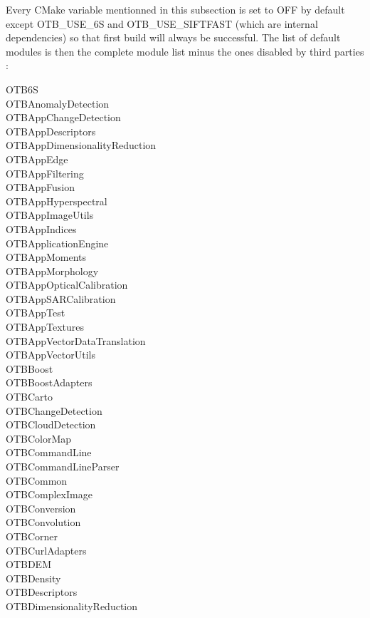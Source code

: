 Every CMake variable mentionned in this subsection is set to OFF by default except OTB\_USE\_6S and OTB\_USE\_SIFTFAST (which are internal dependencies) so that first build will always be successful. The list of default modules is then the complete module list minus the ones disabled by third parties : 

\begin{multicols}{3}
\small
OTB6S \\
OTBAnomalyDetection \\
OTBAppChangeDetection \\
OTBAppDescriptors \\
OTBAppDimensionalityReduction \\
OTBAppEdge \\
OTBAppFiltering \\
OTBAppFusion \\
OTBAppHyperspectral \\
OTBAppImageUtils \\
OTBAppIndices \\
OTBApplicationEngine \\
OTBAppMoments \\
OTBAppMorphology \\
OTBAppOpticalCalibration \\
OTBAppSARCalibration \\
OTBAppTest \\
OTBAppTextures \\
OTBAppVectorDataTranslation \\
OTBAppVectorUtils \\
OTBBoost \\
OTBBoostAdapters \\
OTBCarto \\
OTBChangeDetection \\
OTBCloudDetection \\
OTBColorMap \\
OTBCommandLine \\
OTBCommandLineParser \\
OTBCommon \\
OTBComplexImage \\
OTBConversion \\
OTBConvolution \\
OTBCorner \\
OTBCurlAdapters \\
OTBDEM \\
OTBDensity \\
OTBDescriptors \\
OTBDimensionalityReduction \\

\end{multicols}
